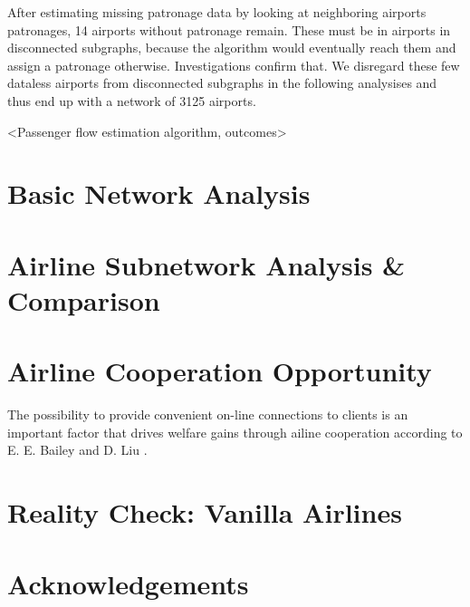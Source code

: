 \documentclass[twocolumn]{tum-article}
\begin{document}
After estimating missing patronage data by looking at neighboring airports patronages, 14 airports without patronage remain. These must be in airports in disconnected subgraphs, because the algorithm would eventually reach them and assign a patronage otherwise. Investigations confirm that. We disregard these few dataless airports from disconnected subgraphs in the following analysises and thus end up with a network of 3125 airports. 

<Passenger flow estimation algorithm, outcomes>

\section{Basic Network Analysis}


\section{Airline Subnetwork Analysis \& Comparison}


\section{Airline Cooperation Opportunity}

The possibility to provide convenient on-line connections to clients is an important factor that drives welfare gains through ailine cooperation according to E. E. Bailey and D. Liu \cite{airline_consolidation_and_consumer_welfare}.

\section{Reality Check: Vanilla Airlines}


\section*{Acknowledgements}




\end{document}
